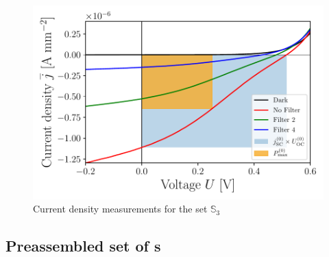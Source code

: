 \documentclass[a4paper,10pt,twocolumn]{article}
\begin{document}
\begin{extract*}
\begin{figure}[h]\centering
	\includegraphics[width=\columnwidth]{../../../IV-Curve-Analysis/OSC2Graph.pdf}
	\caption{Current density measurements for the set $\mathbb{S}_3$}
	\label{fig:OSC3Graph}
\end{figure}

\subsection{Preassembled set of \BHSC s}


\end{extract*}
\end{document}
